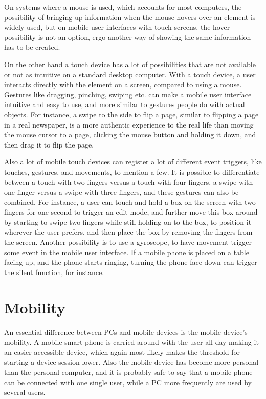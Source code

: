 On systems where a mouse is used, which accounts for most computers, the possibility of bringing up information when the mouse hovers over an element is widely used, but on mobile user interfaces with touch screens, the hover possibility is not an option, ergo another way of showing the same information has to be created.

On the other hand a touch device has a lot of possibilities that are not available or not as intuitive on a standard desktop computer. With a touch device, a user interacts directly with the element on a screen, compared to using a mouse. Gestures like dragging, pinching, swiping etc. can make a mobile user interface intuitive and easy to use, and more similar to gestures people do with actual objects. For instance, a swipe to the side to flip a page, similar to flipping a page in a real newspaper, is a more authentic experience to the real life than moving the mouse cursor to a page, clicking the mouse button and holding it down, and then drag it to flip the page.

Also a lot of mobile touch devices can register a lot of different event triggers, like touches, gestures, and movements, to mention a few. It is possible to differentiate between a touch with two fingers versus a touch with four fingers, a swipe with one finger versus a swipe with three fingers, and these gestures can also be combined. For instance, a user can touch and hold a box on the screen with two fingers for one second to trigger an edit mode, and further move this box around by starting to swipe two fingers while still holding on to the box, to position it wherever the user prefers, and then place the box by removing the fingers from the screen. Another possibility is to use a gyroscope, to have movement trigger some event in the mobile user interface. If a mobile phone is placed on a table facing up, and the phone starts ringing, turning the phone face down can trigger the silent function, for instance.

\section{Mobility}
An essential difference between PCs and mobile devices is the mobile device's mobility. A mobile smart phone is carried around with the user all day making it an easier accessible device, which again most likely makes the threshold for starting a device session lower. Also the mobile device has become more personal than the personal computer, and it is probably safe to say that a mobile phone can be connected with one single user, while a PC more frequently are used by several users.

